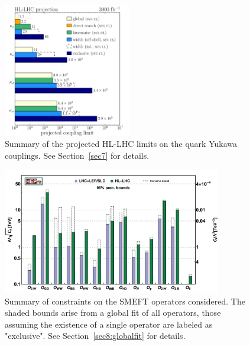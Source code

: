 \documentclass[../report.tex]{subfiles}
\begin{document}
\begin{figure}[b!]
\begin{center}
\includegraphics[width=0.50\textwidth]{section10/img/Yukawa} 
    \caption{Summary of the projected HL-LHC limits on the quark
      Yukawa couplings. See Section~\ref{sec7} for details. \label{fig:HiggsFlavor}
      }
\end{center}
\end{figure}

\begin{figure}
\begin{center}
\includegraphics[width=0.85\textwidth,trim=0cm 0cm 0cm 0.7cm,clip]{section10/img/EFT.pdf}
\vspace{2mm}
    \caption{Summary of constraints on the SMEFT operators   considered. The shaded bounds arise from a global fit of all operators, those assuming the existence of a single operator are labeled as "exclusive". See Section~\ref{sec8:globalfit} for details.\label{fig:HiggsEFT}
    }
\end{center}    
\end{figure}
\end{document}
